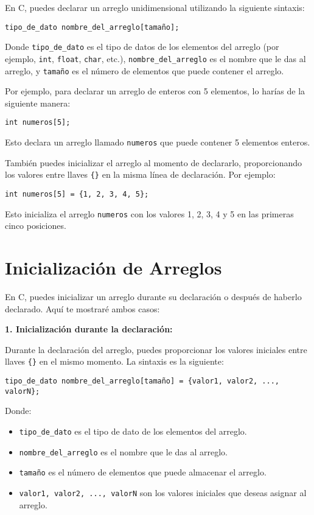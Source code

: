\documentclass{article}
\begin{document}
En C, puedes declarar un arreglo unidimensional utilizando la siguiente sintaxis:

\begin{verbatim}
tipo_de_dato nombre_del_arreglo[tamaño];
\end{verbatim}

Donde \texttt{tipo\_de\_dato} es el tipo de datos de los elementos del arreglo (por ejemplo, \texttt{int}, \texttt{float}, \texttt{char}, etc.), \texttt{nombre\_del\_arreglo} es el nombre que le das al arreglo, y \texttt{tamaño} es el número de elementos que puede contener el arreglo.

Por ejemplo, para declarar un arreglo de enteros con 5 elementos, lo harías de la siguiente manera:

\begin{verbatim}
int numeros[5];
\end{verbatim}

Esto declara un arreglo llamado \texttt{numeros} que puede contener 5 elementos enteros.

También puedes inicializar el arreglo al momento de declararlo, proporcionando los valores entre llaves \texttt{\{\}} en la misma línea de declaración. Por ejemplo:

\begin{verbatim}
int numeros[5] = {1, 2, 3, 4, 5};
\end{verbatim}

Esto inicializa el arreglo \texttt{numeros} con los valores 1, 2, 3, 4 y 5 en las primeras cinco posiciones.
\newline
\section{Inicialización de Arreglos}

En C, puedes inicializar un arreglo durante su declaración o después de haberlo declarado. Aquí te mostraré ambos casos:

\textbf{1. Inicialización durante la declaración:}

Durante la declaración del arreglo, puedes proporcionar los valores iniciales entre llaves \texttt{\{\}} en el mismo momento. La sintaxis es la siguiente:

\begin{verbatim}
tipo_de_dato nombre_del_arreglo[tamaño] = {valor1, valor2, ..., valorN};
\end{verbatim}

Donde:
\begin{itemize}
    \item \texttt{tipo\_de\_dato} es el tipo de dato de los elementos del arreglo.
    \item \texttt{nombre\_del\_arreglo} es el nombre que le das al arreglo.
    \item \texttt{tamaño} es el número de elementos que puede almacenar el arreglo.
    \item \texttt{valor1, valor2, ..., valorN} son los valores iniciales que deseas asignar al arreglo.
\end{itemize}
\end{document}
